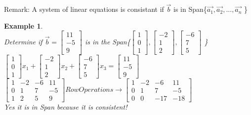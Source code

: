\documentclass[a4paper,12pt,openany]{book}
\theoremstyle{defn}
\theoremstyle{expl}
\newtheorem{expl}{Example}[section]
\begin{document}
Remark: A system of linear equations is consistant if $\vec{b}$ is in Span\{$\vec{a_1},\vec{a_2},...,\vec{a_n}$ \}\\
\begin{expl}\-\\
\textup{
Determine if $\vec{b} = \left[\begin{array}{c}11\\-5\\9\end{array}\right]$ is in the Span\{$\left[\begin{array}{c}1\\0\\1\end{array}\right],
\left[\begin{array}{c}-2\\1\\2\end{array}\right],
\left[\begin{array}{c}-6\\7\\5\end{array}\right]$ \}\\
$\left[\begin{array}{c}1\\0\\1\end{array}\right]x_1+
\left[\begin{array}{c}-2\\1\\2\end{array}\right]x_2+
\left[\begin{array}{c}-6\\7\\5\end{array}\right]x_3=
\left[\begin{array}{c}11\\-5\\9\end{array}\right]$\\
$\left[\begin{array}{ccc|c}1&-2&-6&11\\0&1&7&-5\\1&2&5&9\end{array}\right]RowOperations\rightarrow\left[\begin{array}{ccc|c}1&-2&-6&11\\0&1&7&-5\\0&0&-17&-18\end{array}\right]$\\
Yes it is in Span because it is consistent!
}\end{expl}
\end{document}
